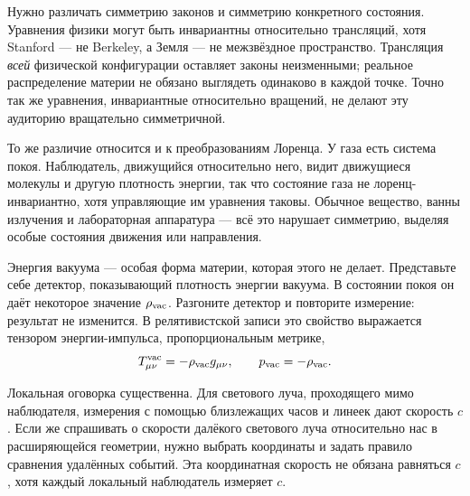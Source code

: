 Нужно различать симметрию законов и симметрию конкретного состояния. Уравнения физики могут быть инвариантны относительно трансляций, хотя Stanford — не Berkeley, а Земля — не межзвёздное пространство. Трансляция \emph{всей} физической конфигурации оставляет законы неизменными; реальное распределение материи не обязано выглядеть одинаково в каждой точке. Точно так же уравнения, инвариантные относительно вращений, не делают эту аудиторию вращательно симметричной.

То же различие относится и к преобразованиям Лоренца. У газа есть система покоя. Наблюдатель, движущийся относительно него, видит движущиеся молекулы и другую плотность энергии, так что состояние газа не лоренц-инвариантно, хотя управляющие им уравнения таковы. Обычное вещество, ванны излучения и лабораторная аппаратура — всё это нарушает симметрию, выделяя особые состояния движения или направления.

Энергия вакуума — особая форма материи, которая этого не делает. Представьте себе детектор, показывающий плотность энергии вакуума. В состоянии покоя он даёт некоторое значение \(\rho_{\rm vac}\). Разгоните детектор и повторите измерение: результат не изменится. В релятивистской записи это свойство выражается тензором энергии-импульса, пропорциональным метрике,
\begin{equation}
T_{\mu\nu}^{\rm vac}=-\rho_{\rm vac}g_{\mu\nu},
\qquad
p_{\rm vac}=-\rho_{\rm vac}.
\label{eq:l08-vacuum-stress}
\end{equation}

Локальная оговорка существенна. Для светового луча, проходящего мимо наблюдателя, измерения с помощью близлежащих часов и линеек дают скорость \(c\). Если же спрашивать о скорости далёкого светового луча относительно нас в расширяющейся геометрии, нужно выбрать координаты и задать правило сравнения удалённых событий. Эта координатная скорость не обязана равняться \(c\), хотя каждый локальный наблюдатель измеряет \(c\).

\begin{classroomqa}
\end{classroomqa}

